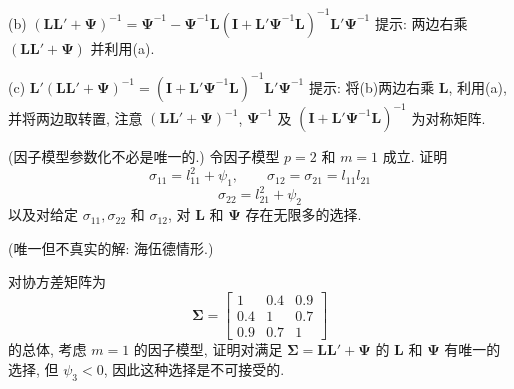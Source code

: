 (b) $(\mathbf{L}\mathbf{L}'+\boldsymbol{\Psi})^{-1}=\boldsymbol{\Psi}^{-1}-\boldsymbol{\Psi}^{-1}\mathbf{L}(\mathbf{I}+\mathbf{L}'\boldsymbol{\Psi}^{-1}\mathbf{L})^{-1}\mathbf{L}'\boldsymbol{\Psi}^{-1}$
提示: 两边右乘 $(\mathbf{L}\mathbf{L}'+\boldsymbol{\Psi})$ 并利用(a).

(c) $\mathbf{L}'(\mathbf{L}\mathbf{L}'+\boldsymbol{\Psi})^{-1}=(\mathbf{I}+\mathbf{L}'\boldsymbol{\Psi}^{-1}\mathbf{L})^{-1}\mathbf{L}'\boldsymbol{\Psi}^{-1}$
提示: 将(b)两边右乘 $\mathbf{L}$, 利用(a), 并将两边取转置, 注意 $(\mathbf{L}\mathbf{L}'+\boldsymbol{\Psi})^{-1}$, $\boldsymbol{\Psi}^{-1}$ 及 $(\mathbf{I}+\mathbf{L}'\boldsymbol{\Psi}^{-1}\mathbf{L})^{-1}$ 为对称矩阵.

\quad (因子模型参数化不必是唯一的.) 令因子模型 $p=2$ 和 $m=1$ 成立. 证明
\[
\sigma_{11}=l_{11}^2+\psi_1,\qquad \sigma_{12}=\sigma_{21}=l_{11}l_{21}
\]
\[
\sigma_{22}=l_{21}^2+\psi_2
\]
以及对给定 $\sigma_{11},\sigma_{22}$ 和 $\sigma_{12}$, 对 $\mathbf{L}$ 和 $\boldsymbol{\Psi}$ 存在无限多的选择.

\quad (唯一但不真实的解: 海伍德情形.)

对协方差矩阵为
\[
\boldsymbol{\Sigma}=\begin{bmatrix}1&0.4&0.9\\0.4&1&0.7\\0.9&0.7&1\end{bmatrix}
\]
的总体, 考虑 $m=1$ 的因子模型, 证明对满足 $\boldsymbol{\Sigma}=\mathbf{L}\mathbf{L}'+\boldsymbol{\Psi}$ 的 $\mathbf{L}$ 和 $\boldsymbol{\Psi}$ 有唯一的选择, 但 $\psi_3<0$, 因此这种选择是不可接受的.
